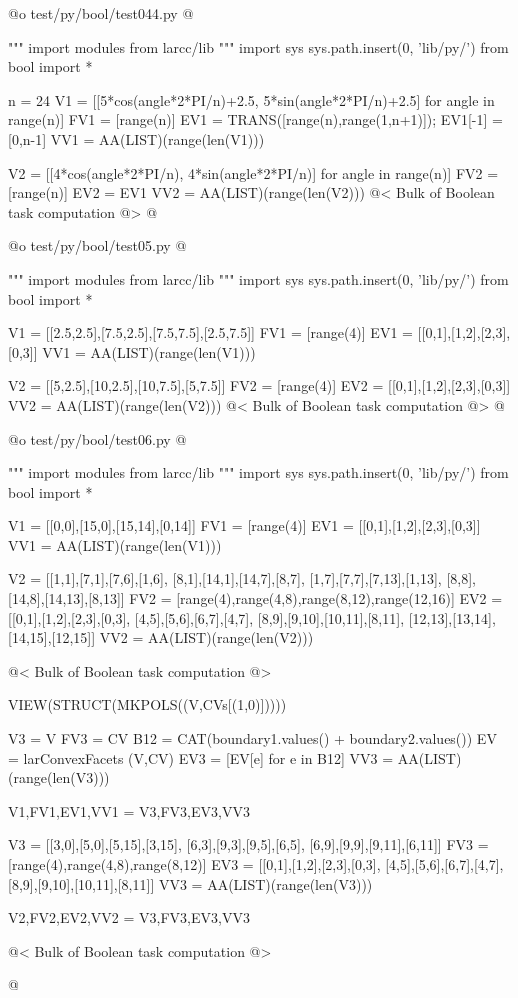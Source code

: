 \documentclass[11pt,oneside]{article}	%
\begin{document}
@o test/py/bool/test044.py
@{""" import modules from larcc/lib """
import sys
sys.path.insert(0, 'lib/py/')
from bool import *

n = 24
V1 = [[5*cos(angle*2*PI/n)+2.5, 5*sin(angle*2*PI/n)+2.5] for angle in range(n)]
FV1 = [range(n)]
EV1 = TRANS([range(n),range(1,n+1)]); EV1[-1] = [0,n-1]
VV1 = AA(LIST)(range(len(V1)))

V2 = [[4*cos(angle*2*PI/n), 4*sin(angle*2*PI/n)] for angle in range(n)]
FV2 = [range(n)]
EV2 = EV1
VV2 = AA(LIST)(range(len(V2)))
@< Bulk of Boolean task computation @>
@}

@o test/py/bool/test05.py
@{""" import modules from larcc/lib """
import sys
sys.path.insert(0, 'lib/py/')
from bool import *

V1 = [[2.5,2.5],[7.5,2.5],[7.5,7.5],[2.5,7.5]]
FV1 = [range(4)]
EV1 = [[0,1],[1,2],[2,3],[0,3]]
VV1 = AA(LIST)(range(len(V1)))

V2 = [[5,2.5],[10,2.5],[10,7.5],[5,7.5]]
FV2 = [range(4)]
EV2 = [[0,1],[1,2],[2,3],[0,3]]
VV2 = AA(LIST)(range(len(V2)))
@< Bulk of Boolean task computation @>
@}

@o test/py/bool/test06.py
@{""" import modules from larcc/lib """
import sys
sys.path.insert(0, 'lib/py/')
from bool import *

V1 = [[0,0],[15,0],[15,14],[0,14]]
FV1 = [range(4)]
EV1 = [[0,1],[1,2],[2,3],[0,3]]
VV1 = AA(LIST)(range(len(V1)))

V2 = [[1,1],[7,1],[7,6],[1,6], [8,1],[14,1],[14,7],[8,7], [1,7],[7,7],[7,13],[1,13], [8,8],[14,8],[14,13],[8,13]]
FV2 = [range(4),range(4,8),range(8,12),range(12,16)]
EV2 = [[0,1],[1,2],[2,3],[0,3], [4,5],[5,6],[6,7],[4,7], [8,9],[9,10],[10,11],[8,11], [12,13],[13,14],[14,15],[12,15]]
VV2 = AA(LIST)(range(len(V2)))

@< Bulk of Boolean task computation @>

VIEW(STRUCT(MKPOLS((V,CVs[(1,0)]))))

V3 = V
FV3 = CV
B12 = CAT(boundary1.values() + boundary2.values())
EV = larConvexFacets (V,CV)
EV3 = [EV[e] for e in B12]
VV3 = AA(LIST)(range(len(V3)))

V1,FV1,EV1,VV1 = V3,FV3,EV3,VV3

V3 = [[3,0],[5,0],[5,15],[3,15], [6,3],[9,3],[9,5],[6,5], [6,9],[9,9],[9,11],[6,11]]
FV3 = [range(4),range(4,8),range(8,12)]
EV3 = [[0,1],[1,2],[2,3],[0,3], [4,5],[5,6],[6,7],[4,7], [8,9],[9,10],[10,11],[8,11]]
VV3 = AA(LIST)(range(len(V3)))

V2,FV2,EV2,VV2 = V3,FV3,EV3,VV3

@< Bulk of Boolean task computation @>

@}
\end{document}
